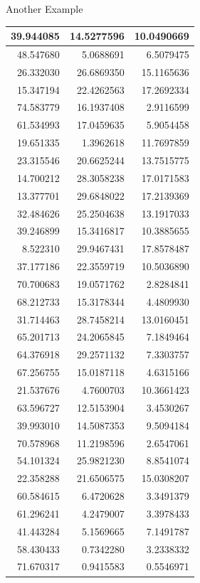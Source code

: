 \documentclass[
  ignorenonframetext,
]{beamer}
\begin{document}
\begin{frame}{Another Example}
\begin{table}
\begin{tabular}[t]{r|r|r}
\hline
39.944085 & 14.5277596 & 10.0490669\\
\hline
48.547680 & 5.0688691 & 6.5079475\\
\hline
26.332030 & 26.6869350 & 15.1165636\\
\hline
15.347194 & 22.4262563 & 17.2692334\\
\hline
74.583779 & 16.1937408 & 2.9116599\\
\hline
61.534993 & 17.0459635 & 5.9054458\\
\hline
19.651335 & 1.3962618 & 11.7697859\\
\hline
23.315546 & 20.6625244 & 13.7515775\\
\hline
14.700212 & 28.3058238 & 17.0171583\\
\hline
13.377701 & 29.6848022 & 17.2139369\\
\hline
32.484626 & 25.2504638 & 13.1917033\\
\hline
39.246899 & 15.3416817 & 10.3885655\\
\hline
8.522310 & 29.9467431 & 17.8578487\\
\hline
37.177186 & 22.3559719 & 10.5036890\\
\hline
70.700683 & 19.0571762 & 2.8284841\\
\hline
68.212733 & 15.3178344 & 4.4809930\\
\hline
31.714463 & 28.7458214 & 13.0160451\\
\hline
65.201713 & 24.2065845 & 7.1849464\\
\hline
64.376918 & 29.2571132 & 7.3303757\\
\hline
67.256755 & 15.0187118 & 4.6315166\\
\hline
21.537676 & 4.7600703 & 10.3661423\\
\hline
63.596727 & 12.5153904 & 3.4530267\\
\hline
39.993010 & 14.5087353 & 9.5094184\\
\hline
70.578968 & 11.2198596 & 2.6547061\\
\hline
54.101324 & 25.9821230 & 8.8541074\\
\hline
22.358288 & 21.6506575 & 15.0308207\\
\hline
60.584615 & 6.4720628 & 3.3491379\\
\hline
61.296241 & 4.2479007 & 3.3978433\\
\hline
41.443284 & 5.1569665 & 7.1491787\\
\hline
58.430433 & 0.7342280 & 3.2338332\\
\hline
71.670317 & 0.9415583 & 0.5546971\\

\end{tabular}
\end{table}
\end{frame}
\end{document}
